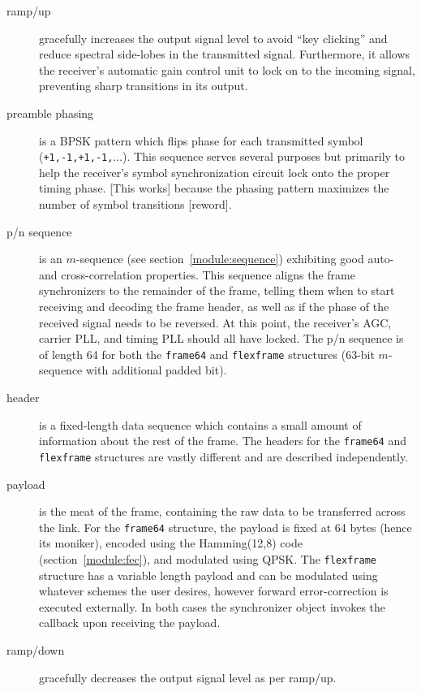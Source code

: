 \begin{description}
\item[{\sf ramp/up}]
    gracefully increases the output signal level to avoid ``key clicking'' and
    reduce spectral side-lobes in the transmitted signal.
    Furthermore, it allows the receiver's automatic gain control unit to
    lock on to the incoming signal, preventing sharp transitions in its
    output.
\item[{\sf preamble phasing}]
    is a BPSK pattern which flips phase for each transmitted symbol
    ({\tt +1,-1,+1,-1,$\ldots$}).
    This sequence serves several purposes but primarily to help the receiver's
    symbol synchronization circuit lock onto the proper timing phase.
    [This works] because the phasing pattern maximizes the number of symbol
    transitions [reword].
\item[{\sf p/n sequence}]
    is an $m$-sequence (see section~\ref{module:sequence}) exhibiting good
    auto- and cross-correlation properties.
    This sequence aligns the frame synchronizers to the remainder of the
    frame, telling them when to start receiving and decoding the frame header,
    as well as if the phase of the received signal needs to be reversed.
    At this point, the receiver's AGC, carrier PLL, and timing PLL should all
    have locked.
    The p/n sequence is of length 64 for both the {\tt frame64} and
    {\tt flexframe} structures (63-bit $m$-sequence with additional padded
    bit).
\item[{\sf header}]
    is a fixed-length data sequence which contains a small amount of
    information about the rest of the frame.
    The headers for the {\tt frame64} and {\tt flexframe} structures are
    vastly different and are described independently.
\item[{\sf payload}]
    is the meat of the frame, containing the raw data to be transferred across
    the link.
    For the {\tt frame64} structure, the payload is fixed at 64 bytes (hence
    its moniker), encoded using the Hamming(12,8) code
    (section~\ref{module:fec}), and modulated using QPSK.
    The {\tt flexframe} structure has a variable length payload and can be
    modulated using whatever schemes the user desires, however forward
    error-correction is executed externally.
    In both cases the synchronizer object invokes the callback upon receiving
    the payload.
\item[{\sf ramp/down}]
    gracefully decreases the output signal level as per ramp/up.
\end{description}



